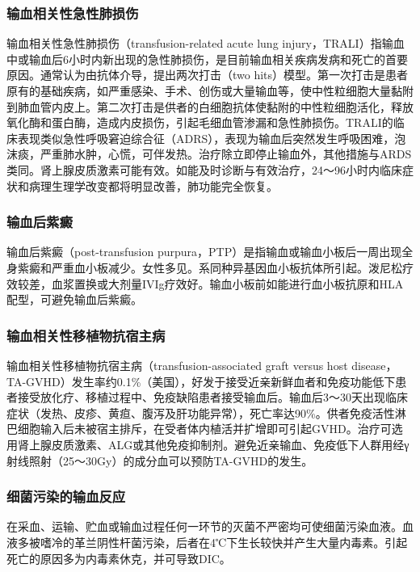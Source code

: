 \subsubsection{输血相关性急性肺损伤}

输血相关性急性肺损伤（transfusion-related acute lung
injury，TRALI）指输血中或输血后6小时内新出现的急性肺损伤，是目前输血相关疾病发病和死亡的首要原因。通常认为由抗体介导，提出两次打击（two
hits）模型。第一次打击是患者原有的基础疾病，如严重感染、手术、创伤或大量输血等，使中性粒细胞大量黏附到肺血管内皮上。第二次打击是供者的白细胞抗体使黏附的中性粒细胞活化，释放氧化酶和蛋白酶，造成内皮损伤，引起毛细血管渗漏和急性肺损伤。TRALI的临床表现类似急性呼吸窘迫综合征（ADRS），表现为输血后突然发生呼吸困难，泡沫痰，严重肺水肿，心慌，可伴发热。治疗除立即停止输血外，其他措施与ARDS类同。肾上腺皮质激素可能有效。如能及时诊断与有效治疗，24～96小时内临床症状和病理生理学改变都将明显改善，肺功能完全恢复。

\subsubsection{输血后紫癜}

输血后紫癜（post-transfusion
purpura，PTP）是指输血或输血小板后一周出现全身紫癜和严重血小板减少。女性多见。系同种异基因血小板抗体所引起。泼尼松疗效较差，血浆置换或大剂量IVIg疗效好。输血小板前如能进行血小板抗原和HLA配型，可避免输血后紫癜。

\subsubsection{输血相关性移植物抗宿主病}

输血相关性移植物抗宿主病（transfusion-associated graft versus host
disease，TA-GVHD）发生率约0.1\%（美国），好发于接受近亲新鲜血者和免疫功能低下患者接受放化疗、移植过程中、免疫缺陷患者接受输血后。输血后3～30天出现临床症状（发热、皮疹、黄疸、腹泻及肝功能异常），死亡率达90\%。供者免疫活性淋巴细胞输入后未被宿主排斥，在受者体内植活并扩增即可引起GVHD。治疗可选用肾上腺皮质激素、ALG或其他免疫抑制剂。避免近亲输血、免疫低下人群用经γ射线照射（25～30Gy）的成分血可以预防TA-GVHD的发生。

\subsubsection{细菌污染的输血反应}

在采血、运输、贮血或输血过程任何一环节的灭菌不严密均可使细菌污染血液。血液多被嗜冷的革兰阴性杆菌污染，后者在4℃下生长较快并产生大量内毒素。引起死亡的原因多为内毒素休克，并可导致DIC。

